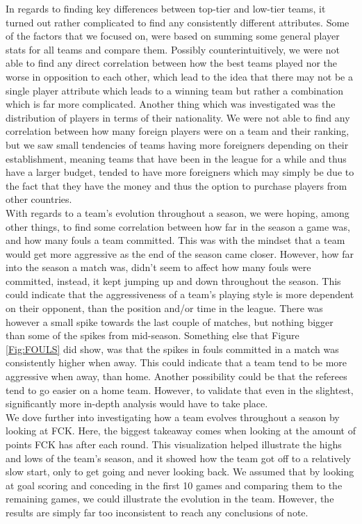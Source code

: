 \documentclass[Report.tex]{subfiles}
\begin{document}
In regards to finding key differences between top-tier and low-tier teams, it turned out rather complicated to find any consistently different attributes. Some of the factors that we focused on, were based on summing some general player stats for all teams and compare them. Possibly counterintuitively, we were not able to find any direct correlation between how the best teams played nor the worse in opposition to each other, which lead to the idea that there may not be a single player attribute which leads to a winning team but rather a combination which is far more complicated. Another thing which was investigated was the distribution of players in terms of their nationality. We were not able to find any correlation between how many foreign players were on a team and their ranking, but we saw small tendencies of teams having more foreigners depending on their establishment, meaning teams that have been in the league for a while and thus have a larger budget, tended to have more foreigners which may simply be due to the fact that they have the money and thus the option to purchase players from other countries. \\

With regards to a team's evolution throughout a season, we were hoping, among other things, to find some correlation between how far in the season a game was, and how many fouls a team committed.
This was with the mindset that a team would get more aggressive as the end of the season came closer. However, how far into the season a match was, didn't seem to affect how many fouls were committed, instead, it kept jumping up and down throughout the season. This could indicate that the aggressiveness of a team's playing style is more dependent on their opponent, than the position and/or time in the league. There was however a small spike towards the last couple of matches, but nothing bigger than some of the spikes from mid-season. Something else that Figure \ref{Fig:FOULS} did show, was that the spikes in fouls committed in a match was consistently higher when away. This could indicate that a team tend to be more aggressive when away, than home. Another possibility could be that the referees tend to go easier on a home team. However, to validate that even in the slightest, significantly more in-depth analysis would have to take place. \\

We dove further into investigating how a team evolves throughout a season by looking at FCK. Here, the biggest takeaway comes when looking at the amount of points FCK has after each round. This visualization helped illustrate the highs and lows of the team’s season, and it showed how the team got off to a relatively slow start, only to get going and never looking back. We assumed that by looking at goal scoring and conceding in the first 10 games and comparing them to the remaining games, we could illustrate the evolution in the team. However, the results are simply far too inconsistent to reach any conclusions of note. 
\end{document}
